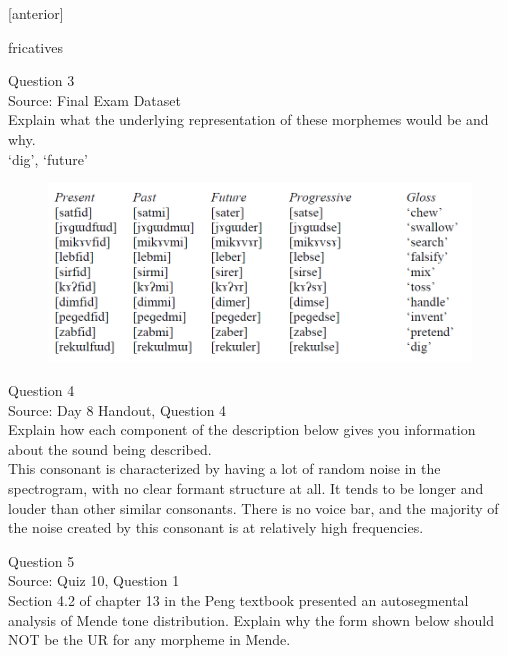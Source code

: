 \documentclass[12pt]{article}
\begin{document}
{[anterior]}

fricatives


\newpage

{\large Question 3}\\

Source: Final Exam Dataset\\

Explain what the underlying representation of these morphemes would be and why.\\

`dig', `future'

\begin{figure}[H]
\includegraphics{../images/final_dataset.png}
\end{figure}

\newpage

{\large Question 4}\\

Source: Day 8 Handout, Question 4\\

Explain how each component of the description below gives you information about the sound being described.\\

This consonant is characterized by having a lot of random noise in the spectrogram, with no clear formant structure at all. It tends to be longer and louder than other similar consonants. There is no voice bar, and the majority of the noise created by this consonant is at relatively high frequencies.


\newpage

{\large Question 5}\\

Source: Quiz 10, Question 1\\

Section 4.2 of chapter 13 in the Peng textbook presented an autosegmental analysis of Mende tone distribution. Explain why the form shown below should NOT be the UR for any morpheme in Mende.\\
\end{document}
